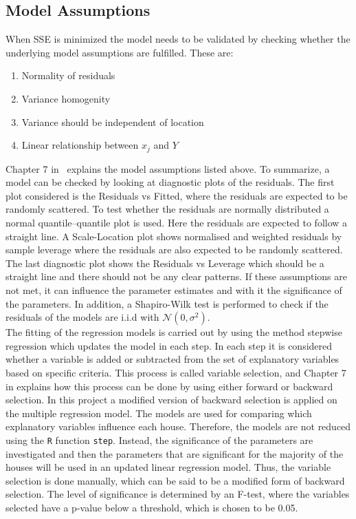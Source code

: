 \subsection{Model Assumptions}
\noindent When SSE is minimized the model needs to be validated by checking whether the underlying model assumptions are fulfilled. These are:
\begin{enumerate} [label=\textbf{\arabic*}]
    \item Normality of residuals
    \item Variance homogenity
    \item Variance should be independent of location
    \item Linear relationship between $x_j$ and $Y$
\end{enumerate}
Chapter 7 in \cite{Stat_bog} explains the model assumptions listed above. To summarize, a model can be checked by looking at diagnostic plots of the residuals. The first plot considered is the Residuals vs Fitted, where the residuals are expected to be randomly scattered. To test whether the residuals are normally distributed a normal quantile–quantile plot is used. Here the residuals are expected to follow a straight line. A Scale-Location plot shows normalised and weighted residuals by sample leverage where the residuals are also expected to be randomly scattered. The last diagnostic plot shows the Residuals vs Leverage which should be a straight line and there should not be any clear patterns. If these assumptions are not met, it can influence the parameter estimates and with it the significance of the parameters. In addition, a Shapiro-Wilk test is performed to check if the residuals of the models are i.i.d with $\mathcal{N}(0,\sigma^2)$. \\

\noindent The fitting of the regression models is carried out by using the method stepwise regression which updates the model in each step. In each step it is considered whether a variable is added or subtracted from the set of explanatory variables based on specific criteria. This process is called variable selection, and Chapter 7 in \cite{Stat_bog2} explains how this process can be done by using either forward or backward selection. In this project a modified version of backward selection is applied on the multiple regression model. The models are used for comparing which explanatory variables influence each house. Therefore, the models are not reduced using the \texttt{R} function \texttt{step}. Instead, the significance of the parameters are investigated and then the parameters that are significant for the majority of the houses will be used in an updated linear regression model. Thus, the variable selection is done manually, which can be said to be a modified form of backward selection. The level of significance is determined by an F-test, where the variables selected have a p-value below a threshold, which is chosen to be 0.05.\\

